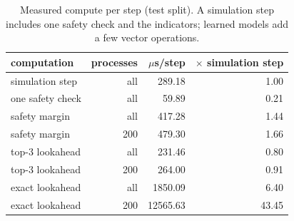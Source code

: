 \begin{table}[t]
\centering
\footnotesize
\caption{Measured compute per step (test split). A simulation step includes one safety check and the indicators; learned models add a few vector operations.}
\label{tab:cost}
\begin{tabular}{lrrr}
\toprule
computation & processes & $\mu$s/step & $\times$ simulation step \\
\midrule
simulation step & all & 289.18 & 1.00 \\
one safety check & all & 59.89 & 0.21 \\
safety margin & all & 417.28 & 1.44 \\
safety margin & 200 & 479.30 & 1.66 \\
top-3 lookahead & all & 231.46 & 0.80 \\
top-3 lookahead & 200 & 264.00 & 0.91 \\
exact lookahead & all & 1850.09 & 6.40 \\
exact lookahead & 200 & 12565.63 & 43.45 \\
\bottomrule
\end{tabular}
\end{table}
